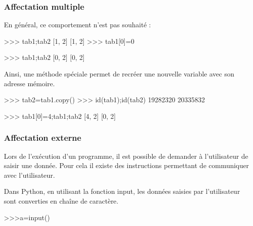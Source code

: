 \begin{frame}[fragile]
\frametitle{Affectation multiple}
En général, ce comportement n'est pas souhaité :

\begin{GrayBox}[0.75\textwidth]
\begin{minipage}[t]{0.4\linewidth}
\begin{verbatimtab}[3]
>>> tab1;tab2
	[1, 2]
	[1, 2]
>>> tab1[0]=0
\end{verbatimtab}
\end{minipage}\hfill
\begin{minipage}[t]{0.4\linewidth}
\begin{verbatimtab}[3]
>>> tab1;tab2
	[0, 2]
	[0, 2]
\end{verbatimtab}
\end{minipage}
\end{GrayBox}

Ainsi, une méthode spéciale permet de recréer une nouvelle variable avec son adresse mémoire.

\begin{GrayBox}[0.75\textwidth]
\begin{minipage}[t]{0.4\linewidth}
\begin{verbatimtab}[3]
>>> tab2=tab1.copy()
>>> id(tab1);id(tab2)
	19282320
	20335832
\end{verbatimtab}
\end{minipage}\hfill
\begin{minipage}[t]{0.4\linewidth}
\begin{verbatimtab}[3]
>>> tab1[0]=4;tab1;tab2
	[4, 2]
	[0, 2]
\end{verbatimtab}
\end{minipage}
\end{GrayBox}



\end{frame}

\begin{frame}[fragile]
\frametitle{Affectation externe}

Lors de l'exécution d'un programme, il est possible de demander à l'utilisateur de saisir une donnée. Pour cela il existe des instructions permettant de communiquer avec l'utilisateur.

Dans Python, en utilisant la fonction input, les données saisies par l'utilisateur sont converties en chaîne de caractère.
\begin{GrayBox}[0.75\textwidth]
\begin{verbatimtab}[3]
>>>a=input()
\end{verbatimtab}
\end{GrayBox}
\end{frame}

